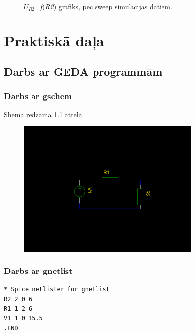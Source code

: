 \documentclass{report}
\begin{document}
\begin{figure}
\begin{center}
\caption{$U_{R2}$=\textit{f}(\textit{R2}) grafiks, pēc sweep simulācijas datiem.}\label{graph:1}
\end{center}
\end{figure}


\chapter{Praktiskā daļa}
\section{Darbs ar GEDA programmām}
\subsection{Darbs ar gschem}
Shēma redzama \ref{att:1} attēlā

\begin{figure}[b!]
\centering
\includegraphics[width=9cm]{01.png}
\label{att:1}
\end{figure}

\newpage
\subsection{Darbs ar gnetlist}
\begin{verbatim}
* Spice netlister for gnetlist
R2 2 0 6
R1 1 2 6
V1 1 0 15.5
.END
\end{verbatim}
\end{document}
